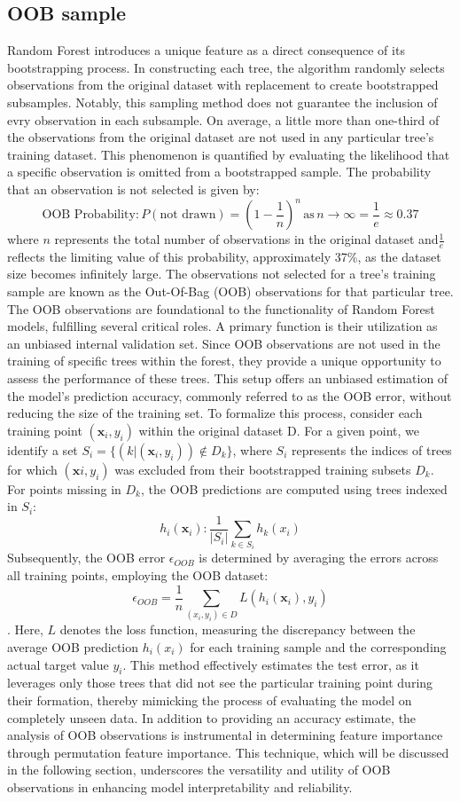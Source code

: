 \documentclass[12pt]{article}
\begin{document}
\subsection{OOB sample}
Random Forest introduces a unique feature as a direct consequence of its bootstrapping process. In constructing each tree, the algorithm randomly selects observations from the original dataset with replacement to create bootstrapped subsamples. Notably, this sampling method does not guarantee the inclusion of evry observation in each subsample. On average, a little more than one-third of the observations from the original dataset are not used in any particular tree's training dataset.
This phenomenon is quantified by evaluating the likelihood that a specific observation is omitted from a bootstrapped sample. The probability that an observation is not selected is given by:
$$\text{OOB Probability}: P(\text{not drawn}) = (1-\frac{1}{n})^{n}\, \text{as}\, n \longrightarrow \infty = \frac{1}{e} \approx 0.37
 $$
 where $n$ represents the total number of observations in the original dataset and$ \frac{1}{e}$ reflects the limiting value of this probability, approximately 37\%, as the dataset size becomes infinitely large. The observations not selected for a tree’s training sample are known as the Out-Of-Bag (OOB) observations for that particular tree.
The OOB observations are foundational to the functionality of Random Forest models, fulfilling several critical roles.  A primary function is their utilization as an unbiased internal validation set. Since OOB observations are not used in the training of specific trees within the forest, they provide a unique opportunity to assess the performance of these trees. This setup offers an unbiased estimation of the model's prediction accuracy, commonly referred to as the OOB error, without reducing the size of the training set.
To formalize this process, consider each training point $(\textbf{x}_i,y_i) $ within the original dataset D. 
For a given point, we identify a set $S_i = \{(k|(\textbf{x}_i,y_i)) \notin D_k\} $, where $S_i$ represents the indices of trees for which $(\textbf{x}i,y_i)$ was excluded from their bootstrapped training subsets $D_k$.  For points missing in $D_k$, the OOB predictions are computed using trees indexed in $S_i$:
 $$h_i(\textbf{x}_i): \frac{1}{|S_i|} \sum_{k \in S_i}h_k(x_i)$$ 
Subsequently, the OOB error $\epsilon_{OOB}$ is determined by averaging the errors across all training points, employing the OOB dataset:
 $$\epsilon_{OOB}= \frac{1}{n}\sum_{(x_i,y_i)\in D} L(h_i(\textbf{x}_i),y_i)$$.
 Here, $L$ denotes the loss function, measuring the discrepancy between the average OOB prediction $h_i(x_i)$ for each training sample and the corresponding actual target value $y_i$. 
  This method effectively estimates the test error, as it leverages only those trees that did not see the particular training point during their formation, thereby mimicking the process of evaluating the model on completely unseen data.
In addition to providing an accuracy estimate, the analysis of OOB observations is instrumental in determining feature importance through permutation feature importance. This technique, which will be discussed in the following section, underscores the versatility and utility of OOB observations in enhancing model interpretability and reliability.
\end{document}
